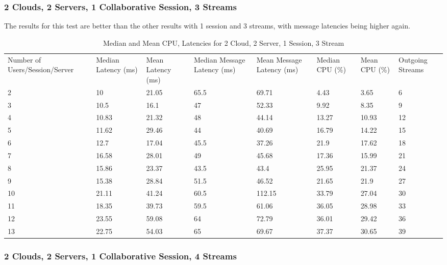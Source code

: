 \clearpage\subsubsection{2 Clouds, 2 Servers, 1 Collaborative Session, 3 Streams}

The results for this test are better than the other results with 1 session and 3 streams, with message latencies being higher again.

\begin{table}
\caption{Median and Mean CPU, Latencies for 2 Cloud, 2 Server, 1 Session, 3 Stream}
\label{table:2cld_2serv_1sess_3str}
\begin{tabu} to\linewidth{|X[c]|X[c]|X[c]|X[c]|X[c]|X[c]|X[c]|X[c]|}
\everyrow{\hline}
\hline
Number of Users/Session/Server & Median Latency (ms) & Mean Latency (ms) & Median Message Latency (ms) & Mean Message Latency (ms) & Median CPU (\%) & Mean CPU (\%) & Outgoing Streams\\
2 & 10 & 21.05 & 65.5 & 69.71 & 4.43 & 3.65 & 6 \\
3 & 10.5 & 16.1 & 47 & 52.33 & 9.92 & 8.35 & 9 \\
4 & 10.83 & 21.32 & 48 & 44.14 & 13.27 & 10.93 & 12 \\
5 & 11.62 & 29.46 & 44 & 40.69 & 16.79 & 14.22 & 15 \\
6 & 12.7 & 17.04 & 45.5 & 37.26 & 21.9 & 17.62 & 18 \\
7 & 16.58 & 28.01 & 49 & 45.68 & 17.36 & 15.99 & 21 \\
8 & 15.86 & 23.37 & 43.5 & 43.4 & 25.95 & 21.37 & 24 \\
9 & 15.38 & 28.84 & 51.5 & 46.52 & 21.65 & 21.9 & 27 \\
10 & 21.11 & 41.24 & 60.5 & 112.15 & 33.79 & 27.04 & 30 \\
11 & 18.35 & 39.73 & 59.5 & 61.06 & 36.05 & 28.98 & 33 \\
12 & 23.55 & 59.08 & 64 & 72.79 & 36.01 & 29.42 & 36 \\
13 & 22.75 & 54.03 & 65 & 69.67 & 37.37 & 30.65 & 39 \\
\end{tabu}
\end{table}

\clearpage\subsubsection{2 Clouds, 2 Servers, 1 Collaborative Session, 4 Streams}

